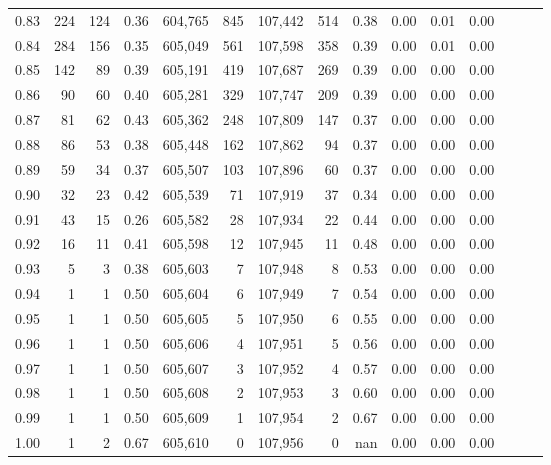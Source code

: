 \begin{tabular}{rrrrrrrrrrrrrrr}
0.83 &     224 &    124 &  0.36 &  604,765 &      845 &  107,442 &      514 &  0.38 &  0.00 &  0.01 &      0.00 \\
0.84 &     284 &    156 &  0.35 &  605,049 &      561 &  107,598 &      358 &  0.39 &  0.00 &  0.01 &      0.00 \\
0.85 &     142 &     89 &  0.39 &  605,191 &      419 &  107,687 &      269 &  0.39 &  0.00 &  0.00 &      0.00 \\
0.86 &      90 &     60 &  0.40 &  605,281 &      329 &  107,747 &      209 &  0.39 &  0.00 &  0.00 &      0.00 \\
0.87 &      81 &     62 &  0.43 &  605,362 &      248 &  107,809 &      147 &  0.37 &  0.00 &  0.00 &      0.00 \\
0.88 &      86 &     53 &  0.38 &  605,448 &      162 &  107,862 &       94 &  0.37 &  0.00 &  0.00 &      0.00 \\
0.89 &      59 &     34 &  0.37 &  605,507 &      103 &  107,896 &       60 &  0.37 &  0.00 &  0.00 &      0.00 \\
0.90 &      32 &     23 &  0.42 &  605,539 &       71 &  107,919 &       37 &  0.34 &  0.00 &  0.00 &      0.00 \\
0.91 &      43 &     15 &  0.26 &  605,582 &       28 &  107,934 &       22 &  0.44 &  0.00 &  0.00 &      0.00 \\
0.92 &      16 &     11 &  0.41 &  605,598 &       12 &  107,945 &       11 &  0.48 &  0.00 &  0.00 &      0.00 \\
0.93 &       5 &      3 &  0.38 &  605,603 &        7 &  107,948 &        8 &  0.53 &  0.00 &  0.00 &      0.00 \\
0.94 &       1 &      1 &  0.50 &  605,604 &        6 &  107,949 &        7 &  0.54 &  0.00 &  0.00 &      0.00 \\
0.95 &       1 &      1 &  0.50 &  605,605 &        5 &  107,950 &        6 &  0.55 &  0.00 &  0.00 &      0.00 \\
0.96 &       1 &      1 &  0.50 &  605,606 &        4 &  107,951 &        5 &  0.56 &  0.00 &  0.00 &      0.00 \\
0.97 &       1 &      1 &  0.50 &  605,607 &        3 &  107,952 &        4 &  0.57 &  0.00 &  0.00 &      0.00 \\
0.98 &       1 &      1 &  0.50 &  605,608 &        2 &  107,953 &        3 &  0.60 &  0.00 &  0.00 &      0.00 \\
0.99 &       1 &      1 &  0.50 &  605,609 &        1 &  107,954 &        2 &  0.67 &  0.00 &  0.00 &      0.00 \\
1.00 &       1 &      2 &  0.67 &  605,610 &        0 &  107,956 &        0 &   nan &  0.00 &  0.00 &      0.00 \\
\bottomrule
\end{tabular}
